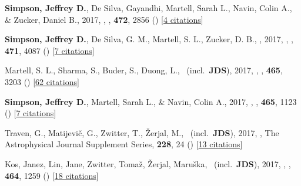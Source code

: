 \item[{\color{numcolor}\scriptsize12}] \textbf{Simpson, Jeffrey D.}, De Silva, Gayandhi, Martell, Sarah L., Navin, Colin A., \& Zucker, Daniel B., 2017, , \mnras, \textbf{472}, 2856 () [\href{http://adsabs.harvard.edu/abs/2017MNRAS.472.2856S}{4 citations}]

\item[{\color{numcolor}\scriptsize11}] \textbf{Simpson, Jeffrey D.}, De Silva, G. M., Martell, S. L., Zucker, D. B., \etal, 2017, , \mnras, \textbf{471}, 4087 () [\href{http://adsabs.harvard.edu/abs/2017MNRAS.471.4087S}{7 citations}]

\item[{\color{numcolor}\scriptsize10}] Martell, S. L., Sharma, S., Buder, S., Duong, L., \etal\ (incl.\ \textbf{JDS}), 2017, , \mnras, \textbf{465}, 3203 () [\href{http://adsabs.harvard.edu/abs/2017MNRAS.465.3203M}{62 citations}]

\item[{\color{numcolor}\scriptsize9}] \textbf{Simpson, Jeffrey D.}, Martell, Sarah L., \& Navin, Colin A., 2017, , \mnras, \textbf{465}, 1123 () [\href{http://adsabs.harvard.edu/abs/2017MNRAS.465.1123S}{7 citations}]

\item[{\color{numcolor}\scriptsize8}] Traven, G., Matijevi{\v{c}}, G., Zwitter, T., {\v{Z}}erjal, M., \etal\ (incl.\ \textbf{JDS}), 2017, , The Astrophysical Journal Supplement Series, \textbf{228}, 24 () [\href{http://adsabs.harvard.edu/abs/2017ApJS..228...24T}{13 citations}]

\item[{\color{numcolor}\scriptsize7}] Kos, Janez, Lin, Jane, Zwitter, Toma{\v{z}}, {\v{Z}}erjal, Maru{\v{s}}ka, \etal\ (incl.\ \textbf{JDS}), 2017, , \mnras, \textbf{464}, 1259 () [\href{http://adsabs.harvard.edu/abs/2017MNRAS.464.1259K}{18 citations}]

